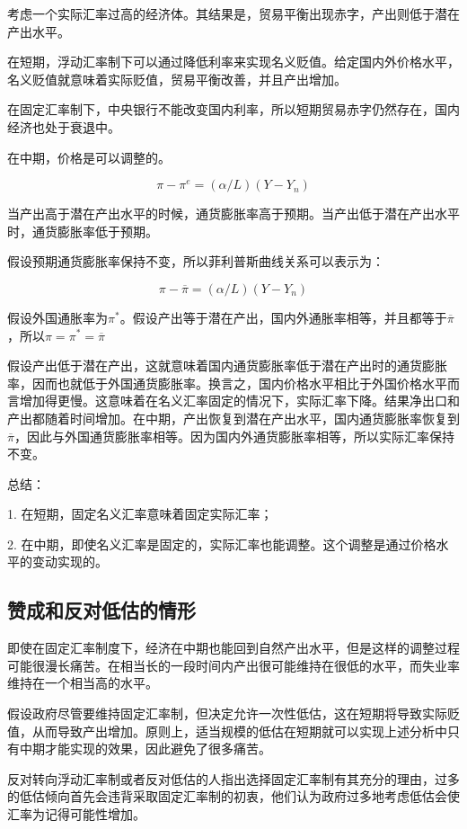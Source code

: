 \documentclass{article}
\begin{document}
考虑一个实际汇率过高的经济体。其结果是，贸易平衡出现赤字，产出则低于潜在产出水平。

在短期，浮动汇率制下可以通过降低利率来实现名义贬值。给定国内外价格水平，名义贬值就意味着实际贬值，贸易平衡改善，并且产出增加。

在固定汇率制下，中央银行不能改变国内利率，所以短期贸易赤字仍然存在，国内经济也处于衰退中。

在中期，价格是可以调整的。

\[
\pi-\pi^e=(\alpha/L)(Y-Y_n)
\]

当产出高于潜在产出水平的时候，通货膨胀率高于预期。当产出低于潜在产出水平时，通货膨胀率低于预期。

假设预期通货膨胀率保持不变，所以菲利普斯曲线关系可以表示为：

\[
\pi-\overline{\pi}=(\alpha/L)(Y-Y_n)
\]

假设外国通胀率为$ \pi^* $。假设产出等于潜在产出，国内外通胀率相等，并且都等于$ \overline{\pi} $，所以$ \pi=\pi^*=\overline{\pi} $

假设产出低于潜在产出，这就意味着国内通货膨胀率低于潜在产出时的通货膨胀率，因而也就低于外国通货膨胀率。换言之，国内价格水平相比于外国价格水平而言增加得更慢。这意味着在名义汇率固定的情况下，实际汇率下降。结果净出口和产出都随着时间增加。在中期，产出恢复到潜在产出水平，国内通货膨胀率恢复到$ \overline{\pi} $，因此与外国通货膨胀率相等。因为国内外通货膨胀率相等，所以实际汇率保持不变。

\hspace*{\fill}

总结：

1. 在短期，固定名义汇率意味着固定实际汇率；

2. 在中期，即使名义汇率是固定的，实际汇率也能调整。这个调整是通过价格水平的变动实现的。

\subsection{赞成和反对低估的情形}

即使在固定汇率制度下，经济在中期也能回到自然产出水平，但是这样的调整过程可能很漫长痛苦。在相当长的一段时间内产出很可能维持在很低的水平，而失业率维持在一个相当高的水平。

假设政府尽管要维持固定汇率制，但决定允许一次性低估，这在短期将导致实际贬值，从而导致产出增加。原则上，适当规模的低估在短期就可以实现上述分析中只有中期才能实现的效果，因此避免了很多痛苦。

反对转向浮动汇率制或者反对低估的人指出选择固定汇率制有其充分的理由，过多的低估倾向首先会违背采取固定汇率制的初衷，他们认为政府过多地考虑低估会使汇率为记得可能性增加。
\end{document}
